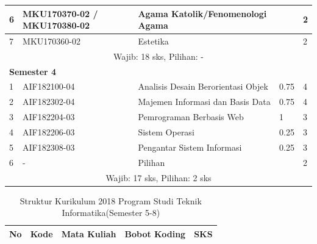 \documentclass[a4paper,twoside]{article}
\begin{document}
\begin{enumerate}
\begin{enumerate}
\begin{table}[H]
\begin{tabular}{|p{0.5cm}|p{2.85cm}|p{4.95cm}|p{2.7cm}|p{2.7cm}|}
					6 &	MKU170370-02 / MKU170380-02 &	Agama Katolik/Fenomenologi Agama & &	2  \\ \hline
					7 &	MKU170360-02 &	Estetika & &	2  \\ \hline
					\multicolumn{5}{|c|}{Wajib: 18 sks, Pilihan: -} \\ \hline
					\multicolumn{5}{|l|}{\textbf{Semester 4}} \\ \hline
					1	& AIF182100-04 &	Analisis Desain Berorientasi Objek &	0.75 &	4  \\ \hline
					2	& AIF182302-04 &	Majemen Informasi dan Basis Data &	0.75 &	4  \\ \hline
					3	& AIF182204-03 &	Pemrograman Berbasis Web &	1 &	3  \\ \hline
					4	& AIF182206-03 &	Sistem Operasi &	0.25 &	3  \\ \hline
					5 &	AIF182308-03 &	Pengantar Sistem Informasi &	0.25 &	3  \\ \hline
					6 &	- &	Pilihan &	&	2  \\ \hline
					\multicolumn{5}{|c|}{Wajib: 17 sks, Pilihan: 2 sks} \\ \hline
				\end{tabular}
			\label{tab:strukturkurikulum2018}
		\end{table}

		\begin{table}[H]
			\caption{Struktur Kurikulum 2018 Program Studi Teknik Informatika(Semester 5-8)}
			\centering
				\begin{tabular}{|p{0.5cm}|p{2.85cm}|p{4.95cm}|p{2.7cm}|p{2.7cm}|}
					\hline
					\multicolumn{1}{|c|}{\textbf{No}} & \multicolumn{1}{c|}{\textbf{Kode}} & \multicolumn{1}{c|}{\textbf{Mata Kuliah}} & \multicolumn{1}{c|}{\textbf{Bobot Koding}} & \multicolumn{1}{c|}{\textbf{SKS}} \\ \hline
					

\end{tabular}
\end{table}
\end{enumerate}
\end{enumerate}
\end{document}
